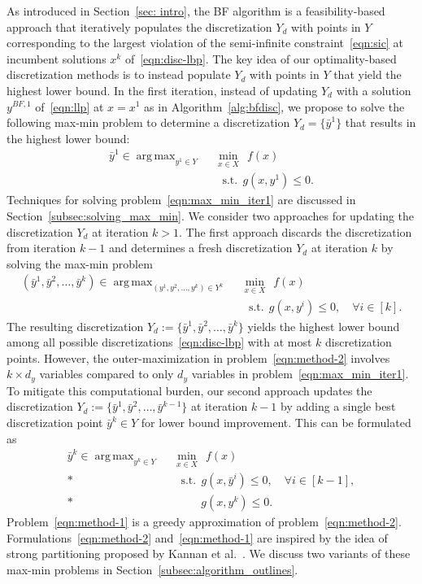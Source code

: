 \documentclass{article}
\DeclareMathOperator*{\argmax}{arg\,max}
\newcommand{\1}[1]{\mathds{1}\left[#1\right]}
\begin{document}
As introduced in Section~\ref{sec: intro}, the BF algorithm is a feasibility-based approach that iteratively populates the discretization $Y_d$ with points in $Y$ corresponding to the largest violation of the semi-infinite constraint~\eqref{eqn:sic} at incumbent solutions $x^k$ of~\eqref{eqn:disc-lbp}. 
The key idea of our optimality-based discretization methods is to instead populate $Y_d$ with points in $Y$ that yield the highest lower bound.
In the first iteration, instead of updating $Y_d$ with a solution $y^{BF,1}$ of~\eqref{eqn:llp} at $x = x^1$ as in Algorithm~\ref{alg:bfdisc}, we propose to solve the following max-min problem to determine a discretization $Y_d = \{\bar{y}^1\}$ that results in the highest lower bound:
\begin{align}
\label{eqn:max_min_iter1}
\bar{y}^1 \in \argmax_{y^1 \in Y} \:\: & \min_{x \in X} \:\: f(x) \\
& \:\:\:\text{s.t.} \:\: g(x,y^1) \leq 0. \nonumber
\end{align}
Techniques for solving problem~\eqref{eqn:max_min_iter1} are discussed in Section~\ref{subsec:solving_max_min}.
We consider two approaches for updating the discretization $Y_d$ at iteration $k > 1$.
The first approach discards the discretization from iteration $k-1$ and determines a fresh discretization $Y_d$ at iteration $k$ by solving the max-min problem
\begin{align}
\label{eqn:method-2}
(\bar{y}^1,\bar{y}^2,\dots,\bar{y}^k) \in \argmax_{(y^1,y^2,\dots,y^k) \in Y^k} \:\: & \min_{x \in X} \:\: f(x) \\
& \:\:\:\text{s.t.} \:\: g(x,y^i) \leq 0, \quad \forall i \in [k]. \nonumber
\end{align}
The resulting discretization $Y_d := \{\bar{y}^1,\bar{y}^2,\dots,\bar{y}^k\}$ yields the highest lower bound among all possible discretizations~\eqref{eqn:disc-lbp} with at most $k$ discretization points.
However, the outer-maximization in problem~\eqref{eqn:method-2} involves \mbox{$k \times d_y$} variables compared to only $d_y$ variables in problem~\eqref{eqn:max_min_iter1}.
To mitigate this computational burden, our second approach updates the discretization $Y_d := \{\bar{y}^1,\bar{y}^2,\dots,\bar{y}^{k-1}\}$ at iteration $k-1$ by adding a single best discretization point $\bar{y}^k \in Y$ for lower bound improvement.
This can be formulated as
\begin{align}
\label{eqn:method-1}
\bar{y}^k \in \argmax_{y^k \in Y} \:\: & \min_{x \in X} \:\: f(x) \\*
& \:\:\:\text{s.t.} \:\: g(x,\bar{y}^i) \leq 0, \quad \forall i \in [k-1], \nonumber \\*
& \quad\quad\:\: g(x,y^k) \leq 0. \nonumber
\end{align}
Problem~\eqref{eqn:method-1} is a greedy approximation of problem~\eqref{eqn:method-2}.
Formulations~\eqref{eqn:method-2} and~\eqref{eqn:method-1} are inspired by the idea of strong partitioning proposed by Kannan et al.\ \cite{kannan2022learning}.
We discuss two variants of these max-min problems in Section~\ref{subsec:algorithm_outlines}.
\end{document}
